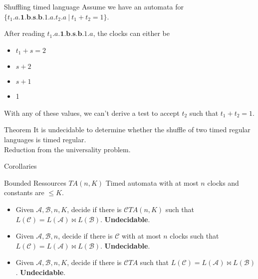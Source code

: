 \begin{frame}{Shuffling timed language}
  Assume we have an automata for $\{t_1.a.\mathbf{1.b.s.b}.1.a.t_2.a~|~t_1+t_2=1\}$.
  
  After reading $t_1.a.\mathbf{1.b.s.b}.1.a$, the clocks can either be
  \begin{itemize}
  \item $t_1+s=2$
  \item $s+2$
  \item $s+1$
  \item 1
  \end{itemize}
  
  With any of these values, we can't derive a test to accept $t_2$ such that $t_1+t_2=1$.
  
  \begin{exampleblock}{Theorem}
    It is undecidable to determine whether the shuffle of two timed regular languages is timed regular.\\
    Reduction from the universality problem.
  \end{exampleblock}
\end{frame}

\begin{frame}{Corollaries}
  \begin{block}{Bounded Ressources}
    $TA(n,K)$ Timed automata with at most $n$ clocks and constants are $\leq K$.\\
    \begin{itemize}
    \item Given $\mathcal{A,B},n,K$, decide if there is $\mathcal{C} TA(n,K)$ such that $L(\mathcal{C})=L(\mathcal{A})\bowtie L(\mathcal{B})$. \textbf{Undecidable}.
    \item Given $\mathcal{A,B},n$, decide if there is $\mathcal{C}$ with at most $n$ clocks such that $L(\mathcal{C})=L(\mathcal{A})\bowtie L(\mathcal{B})$. \textbf{Undecidable}.
    \item Given $\mathcal{A,B},n,K$, decide if there is $\mathcal{C} TA$ such that $L(\mathcal{C})=L(\mathcal{A})\bowtie L(\mathcal{B})$. \textbf{Undecidable}.
    \end{itemize}
  \end{block}
  \vfill
  
    
\end{frame}

